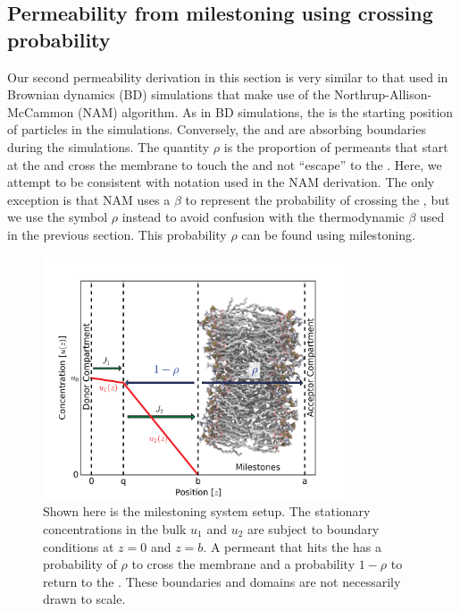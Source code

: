     \subsection{Permeability from milestoning using crossing probability}
        \par Our second permeability derivation in this section is very similar to that used in Brownian dynamics (BD) simulations that make use of the Northrup-Allison-McCammon (NAM) algorithm\cite{Northrup1984}. As in BD simulations, the  is the starting position of particles in the simulations. Conversely, the  and  are absorbing boundaries during the simulations. The quantity $\rho$ is the proportion of permeants that start at the  and cross the membrane to touch the  and not ``escape'' to the . Here, we attempt to be consistent with notation used in the NAM derivation. The only exception is that NAM uses a $\beta$ to represent the probability of crossing the , but we use the symbol $\rho$ instead to avoid confusion with the thermodynamic $\beta$ used in the previous section. This probability $\rho$ can be found using milestoning.

        \begin{figure}[htbp]
        \begin{center}
            \includegraphics[width=0.8\textwidth]{Figures/probplot}
            \caption{Shown here is the milestoning system setup. The stationary concentrations in the bulk $u_1$ and $u_2$ are subject to boundary conditions at $z=0$ and $z=b$. A permeant that hits the  has a probability of $\rho$ to cross the membrane and a probability $1-\rho$ to return to the . These boundaries and domains are not necessarily drawn to scale.}
            \label{fig:prob}
        \end{center}
        \end{figure}


